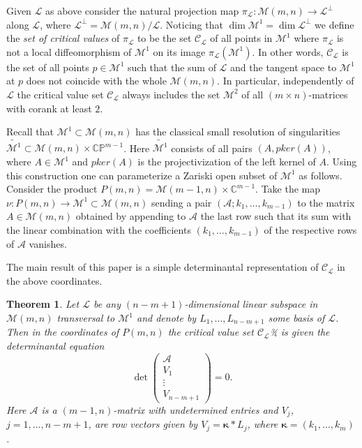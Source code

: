 \documentclass[10pt,twoside,a4paper,reqno]{amsart}
\theoremstyle{plain}
\newtheorem{theo+}           {Theorem}
\theoremstyle{definition}
\theoremstyle{remark}
\newenvironment{theorem}{\begin{theo+}}{\end{theo+}}
\begin{document}
Given ${\mathcal L}$ as above consider the natural projection map $\pi_{\mathcal L}:{\mathcal {M}}(m,n)\to {\mathcal L}^\perp$ along ${\mathcal L}$,  where  ${\mathcal L}^\perp={\mathcal {M}}(m,n)/{\mathcal L}$. Noticing that $\dim {\mathcal {M}}^1=\dim {\mathcal L}^\perp$ we define the {\it set of critical values} of $\pi_{\mathcal L}$ to be 
the set ${\mathcal C}_{\mathcal L}$ of all points in ${\mathcal {M}}^1$ where $\pi_{\mathcal L}$ is not a local diffeomorphism of
${\mathcal {M}}^1$ on its image  $\pi_{\mathcal L}({\mathcal {M}}^1)$. In other words, ${\mathcal C}_{\mathcal L}$ is the set of all points $p\in {\mathcal {M}}^1$ such that the sum of ${\mathcal L}$  and the tangent space to ${\mathcal {M}}^1$ at $p$  does not coincide with the whole ${\mathcal {M}}(m,n)$. In particular,  independently of ${\mathcal L}$ the critical value set ${\mathcal C}_{\mathcal L}$ always includes the set ${\mathcal {M}}^2$ of all $(m\times n)$-matrices with corank at least $2$.

Recall that ${\mathcal {M}}^1\subset {\mathcal {M}}(m,n)$ has the  classical small resolution of singularities $\widetilde{{\mathcal {M}}^1}\subset {\mathcal {M}}(m,n)\times {\mathbb {CP}}^{m-1}$. Here $\widetilde{{\mathcal {M}}^1}$ consists of all pairs $\left(A,pker(A)\right)$, where $A\in {\mathcal {M}}^1$ and $pker(A)$ is the projectivization of the left kernel of $A$.  Using this construction one can parameterize a Zariski open subset of ${\mathcal {M}}^1$ as follows. Consider the product
$P(m,n)= {\mathcal {M}}(m-1,n)\times {\mathbb {C}}^{m-1}$. Take the map $\nu: P(m,n)\to {\mathcal {M}}^1\subset {\mathcal {M}}(m,n)$ sending
a pair $({\mathcal A}; k_1,\ldots,k_{m-1})$ to the matrix $A\in {\mathcal {M}}(m,n)$ obtained by appending to ${\mathcal A}$ the last row such that its sum with  the linear combination with the coefficients $(k_1,\ldots,k_{m-1})$ of the respective rows of ${\mathcal A}$ vanishes.

The  main result of this paper is a simple determinantal representation of ${\mathcal C}_{\mathcal L}$ in the above coordinates.

\begin{theorem} \label{th:determ} Let ${\mathcal L}$ be any  $(n-m+1)$-dimensional linear subspace  in ${\mathcal {M}}(m,n)$ transversal to ${\mathcal {M}}^1$ and denote by  $L_1,\ldots,L_{n-m+1}$ some  basis of  ${\mathcal L}$. Then  in the coordinates of $P(m,n)$ the critical value set  ${\mathcal C}_{\mathcal L}$¾ is given the determinantal equation
\begin{equation}\label{eq:1}
 \det\begin{pmatrix} {\mathcal A}\\
                                V_1\\
                                \vdots\\
                                V_{n-m+1}
 \end{pmatrix}=0.\end{equation}
 Here ${\mathcal A}$ is a $(m-1,n)$-matrix with undetermined entries and $V_j$, $j=1,\ldots,n-m+1$, are row vectors given by $V_j=\mathbf{\kappa}* L_j$, where $\mathbf{\kappa}=(k_1,\ldots,k_{m})$.
\end{theorem}
\end{document}
